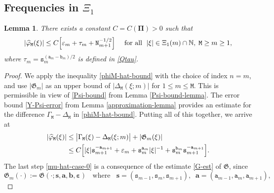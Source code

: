 \documentclass[12pt, twoside]{article}
\newtheorem{lemma}[theorem]{Lemma}
\theoremstyle{definition}
\numberwithin{equation}{section}
\begin{document}
\subsection{Frequencies in $\Xi_1$} 
\begin{lemma} \label{Xi1-lemma}
There exists a constant $C = C(\pmb{\Pi}) > 0$ such that
\begin{equation} 
|\widehat{\varphi}_{\mathtt M}(\xi)| \leq   C \Bigl[ \varepsilon_{m} + \tau_{m} + \mathtt N_{m+1}^{-{1}/{2}}\Bigr] \quad  \text{ for all } \;  |\xi| \in \Xi_1(m) \cap \mathbb N, \; \mathtt M \geq m \geq 1,  \label{mu-hat-case1}
\end{equation} 
where $\tau_m = \mathtt s_m^{(\mathtt a_m-\mathtt b_m)/2}$ is defined in \eqref{Qtau}. 
\end{lemma}
\begin{proof} 
We apply the inequality \eqref{phiM-hat-bound} with the choice of index $n=m$, and use $|\mathfrak G_m|$ as an upper bound of $|\Delta_{\mathtt M}(\xi;m)|$ for $1 \leq m \leq \mathtt M$. This is permissible in view of \eqref{Psi-bound} from Lemma \ref{Psi-bound-lemma}. The error bound \eqref{Y-Psi-error} from Lemma \ref{approximation-lemma} provides an estimate for the difference $\Gamma_{\mathtt M} - \Delta_{\mathtt M}$ in \eqref{phiM-hat-bound}. Putting all of this together, we arrive at  
\begin{align} 
|\widehat{\varphi}_{\mathtt M}(\xi)| 
&\leq  \bigl|\Gamma_{\mathtt M}(\xi) - \Delta_{\mathtt M}(\xi; m)\bigr| + |\mathfrak G_{m}(\xi)| \nonumber \\ 
&\leq C \Bigl[ |\xi| \mathtt s_{m+1}^{-\mathtt a_{m+1}} + \varepsilon_{m} + \mathtt s_{m}^{\mathtt a_{m}} |\xi|^{-1} + \mathtt s_{m}^{\mathtt b_{m}} \mathtt s_{m+1}^{-\mathtt a_{m+1}} \Bigr]. \label{mu-hat-case-0} 
\end{align} 
The last step \eqref{mu-hat-case-0} is a consequence of the estimate \eqref{G-est} of $\mathfrak G$, since
 \[ \mathfrak G_m(\cdot):= \mathfrak G(\cdot; \mathbf s, \mathbf a, \mathbf b, \pmb{\varepsilon})  \; \; \text{ where } \; \; \mathbf s = (\mathtt s_{m -1}, \mathtt s_{m}, \mathtt s_{m+1}), \;\; \mathbf a = (\mathtt a_{m -1}, \mathtt a_{m}, \mathtt a_{m+1}), 
\]
\end{proof}
\end{document}
